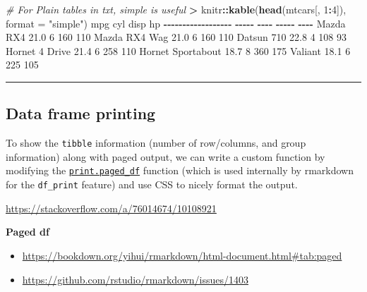 \documentclass[
  a4paper,
  twoside,
  openright]{book}
\newenvironment{Shaded}{\begin{snugshade}}{\end{snugshade}}
\newcommand{\AttributeTok}[1]{\textcolor[rgb]{0.13,0.29,0.53}{#1}}
\newcommand{\CommentTok}[1]{\textcolor[rgb]{0.56,0.35,0.01}{\textit{#1}}}
\newcommand{\DecValTok}[1]{\textcolor[rgb]{0.00,0.00,0.81}{#1}}
\newcommand{\ErrorTok}[1]{\textcolor[rgb]{0.64,0.00,0.00}{\textbf{#1}}}
\newcommand{\FloatTok}[1]{\textcolor[rgb]{0.00,0.00,0.81}{#1}}
\newcommand{\FunctionTok}[1]{\textcolor[rgb]{0.13,0.29,0.53}{\textbf{#1}}}
\newcommand{\NormalTok}[1]{#1}
\newcommand{\SpecialCharTok}[1]{\textcolor[rgb]{0.81,0.36,0.00}{\textbf{#1}}}
\newcommand{\StringTok}[1]{\textcolor[rgb]{0.31,0.60,0.02}{#1}}
\providecommand{\tightlist}{%
  \setlength{\itemsep}{0pt}\setlength{\parskip}{0pt}}
\theoremstyle{definition}
\theoremstyle{definition}
\theoremstyle{definition}
\theoremstyle{definition}
\theoremstyle{remark}
\begin{document}
\begin{Shaded}
\begin{Highlighting}[]
\CommentTok{\# For Plain tables in txt, \textasciigrave{}simple\textasciigrave{} is useful}
\ErrorTok{\textgreater{}}\NormalTok{ knitr}\SpecialCharTok{::}\FunctionTok{kable}\NormalTok{(}\FunctionTok{head}\NormalTok{(mtcars[, }\DecValTok{1}\SpecialCharTok{:}\DecValTok{4}\NormalTok{]), }\AttributeTok{format =} \StringTok{"simple"}\NormalTok{) }
\NormalTok{                      mpg   cyl   disp    hp}
\SpecialCharTok{{-}{-}{-}{-}{-}{-}{-}{-}{-}{-}{-}{-}{-}{-}{-}{-}{-}{-}}  \SpecialCharTok{{-}{-}{-}{-}{-}}  \SpecialCharTok{{-}{-}{-}{-}}  \SpecialCharTok{{-}{-}{-}{-}{-}}  \SpecialCharTok{{-}{-}{-}{-}}
\NormalTok{Mazda RX4            }\FloatTok{21.0}     \DecValTok{6}    \DecValTok{160}   \DecValTok{110}
\NormalTok{Mazda RX4 Wag        }\FloatTok{21.0}     \DecValTok{6}    \DecValTok{160}   \DecValTok{110}
\NormalTok{Datsun }\DecValTok{710}           \FloatTok{22.8}     \DecValTok{4}    \DecValTok{108}    \DecValTok{93}
\NormalTok{Hornet }\DecValTok{4}\NormalTok{ Drive       }\FloatTok{21.4}     \DecValTok{6}    \DecValTok{258}   \DecValTok{110}
\NormalTok{Hornet Sportabout    }\FloatTok{18.7}     \DecValTok{8}    \DecValTok{360}   \DecValTok{175}
\NormalTok{Valiant              }\FloatTok{18.1}     \DecValTok{6}    \DecValTok{225}   \DecValTok{105}
\end{Highlighting}
\end{Shaded}

\begin{center}\rule{0.5\linewidth}{0.5pt}\end{center}

\subsection{Data frame printing}\label{data-frame-printing}

To show the \texttt{tibble} information (number of row/columns, and group information) along with paged output, we can write a custom function by modifying the \href{https://github.com/rstudio/rmarkdown/blob/main/R/html_paged.R\#L241-L248}{\texttt{print.paged\_df}} function (which is used internally by rmarkdown for the \texttt{df\_print} feature) and use CSS to nicely format the output.

\url{https://stackoverflow.com/a/76014674/10108921}

{\textbf{Paged df}}

\begin{itemize}
\tightlist
\item
  \url{https://bookdown.org/yihui/rmarkdown/html-document.html\#tab:paged}
\item
  \url{https://github.com/rstudio/rmarkdown/issues/1403}
\end{itemize}
\end{document}
